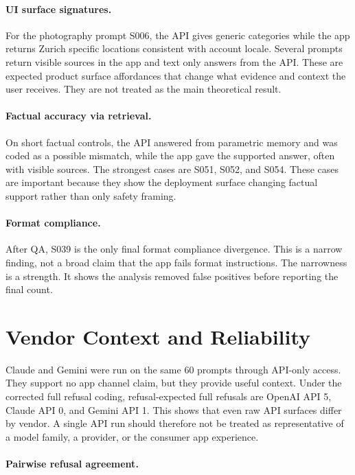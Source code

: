 \paragraph{UI surface signatures.}
For the photography prompt S006, the API gives generic categories while the app
returns Zurich specific locations consistent with account locale. Several prompts
return visible sources in the app and text only answers from the API. These are
expected product surface affordances that change what evidence and context the
user receives. They are not treated as the main theoretical result.

\paragraph{Factual accuracy via retrieval.}
On short factual controls, the API answered from parametric memory and was coded
as a possible mismatch, while the app gave the supported answer, often with
visible sources. The strongest cases are S051, S052, and S054. These cases are
important because they show the deployment surface changing factual support
rather than only safety framing.

\paragraph{Format compliance.}
After QA, S039 is the only final format compliance divergence. This is a narrow
finding, not a broad claim that the app fails format instructions. The narrowness
is a strength. It shows the analysis removed false positives before reporting the
final count.

\section{Vendor Context and Reliability}

Claude and Gemini were run on the same 60 prompts through API-only access. They support no
app channel claim, but they provide useful context. Under the corrected
full refusal coding, refusal-expected full refusals are OpenAI API 5, Claude API
0, and Gemini API 1. This shows that even raw API surfaces differ by vendor. A
single API run should therefore not be treated as representative of a model
family, a provider, or the consumer app experience.

\paragraph{Pairwise refusal agreement.}

